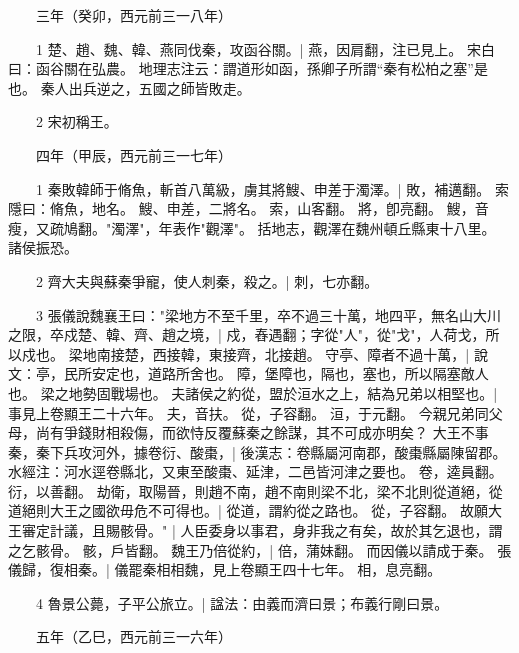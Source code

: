 　　三年（癸卯，西元前三一八年）

　　1 楚、趙、魏、韓、燕同伐秦，攻函谷關。|{
	燕，因肩翻，注已見上。
	宋白曰：函谷關在弘農。
	地理志注云：謂道形如函，孫卿子所謂“秦有松柏之塞”是也。
}
秦人出兵逆之，五國之師皆敗走。


　　2 宋初稱王。


　　四年（甲辰，西元前三一七年）

　　1 秦敗韓師于脩魚，斬首八萬級，虜其將䱸、申差于濁澤。|{
	敗，補邁翻。
	索隱曰：脩魚，地名。
	䱸、申差，二將名。
	索，山客翻。
	將，卽亮翻。
	䱸，音瘦，又疏鳩翻。"濁澤"，年表作"觀澤"。
	括地志，觀澤在魏州頓丘縣東十八里。
}
諸侯振恐。


　　2 齊大夫與蘇秦爭寵，使人刺秦，殺之。|{
	刺，七亦翻。
}

　　3 張儀說魏襄王曰："梁地方不至千里，卒不過三十萬，地四平，無名山大川之限，卒戍楚、韓、齊、趙之境，|{
	戍，舂遇翻；字從"人"，從"戈"，人荷戈，所以戍也。
	梁地南接楚，西接韓，東接齊，北接趙。
}
守亭、障者不過十萬，|{
	說文：亭，民所安定也，道路所舍也。
	障，堡障也，隔也，塞也，所以隔塞敵人也。
}
梁之地勢固戰場也。
	夫諸侯之約從，盟於洹水之上，結為兄弟以相堅也。|{
	事見上卷顯王二十六年。
	夫，音扶。
	從，子容翻。
	洹，于元翻。
}
今親兄弟同父母，尚有爭錢財相殺傷，而欲恃反覆蘇秦之餘謀，其不可成亦明矣？
大王不事秦，秦下兵攻河外，據卷衍、酸棗，|{
	後漢志：卷縣屬河南郡，酸棗縣屬陳留郡。
	水經注：河水逕卷縣北，又東至酸棗、延津，二邑皆河津之要也。
	卷，逵員翻。
	衍，以善翻。
}
劫衛，取陽晉，則趙不南，趙不南則梁不北，梁不北則從道絕，從道絕則大王之國欲毋危不可得也。|{
	從道，謂約從之路也。
	從，子容翻。
}
故願大王審定計議，且賜骸骨。" |{
	人臣委身以事君，身非我之有矣，故於其乞退也，謂之乞骸骨。
	骸，戶皆翻。
}
魏王乃倍從約，|{
	倍，蒲妹翻。
}
而因儀以請成于秦。
	張儀歸，復相秦。|{
	儀罷秦相相魏，見上卷顯王四十七年。
	相，息亮翻。
}

　　4 魯景公薨，子平公旅立。|{
	諡法：由義而濟曰景；布義行剛曰景。
}

　　五年（乙巳，西元前三一六年）

